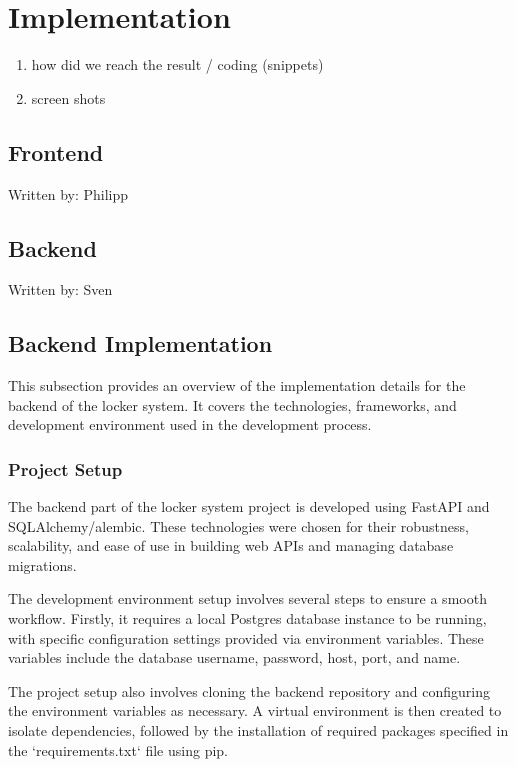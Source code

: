 \section{Implementation}
\begin{enumerate}
    \item how did we reach the result / coding (snippets)
    \item screen shots
\end{enumerate}

\subsection{Frontend}
{\tiny Written by: Philipp}

\subsection{Backend}
{\tiny Written by: Sven}

\subsection{Backend Implementation}

This subsection provides an overview of the implementation details for the backend of the locker system. It covers the technologies, frameworks, and development environment used in the development process.

\subsubsection{Project Setup}

The backend part of the locker system project is developed using FastAPI and SQLAlchemy/alembic. These technologies were chosen for their robustness, scalability, and ease of use in building web APIs and managing database migrations.

The development environment setup involves several steps to ensure a smooth workflow. Firstly, it requires a local Postgres database instance to be running, with specific configuration settings provided via environment variables. These variables include the database username, password, host, port, and name.

The project setup also involves cloning the backend repository and configuring the environment variables as necessary. A virtual environment is then created to isolate dependencies, followed by the installation of required packages specified in the `requirements.txt` file using pip.

